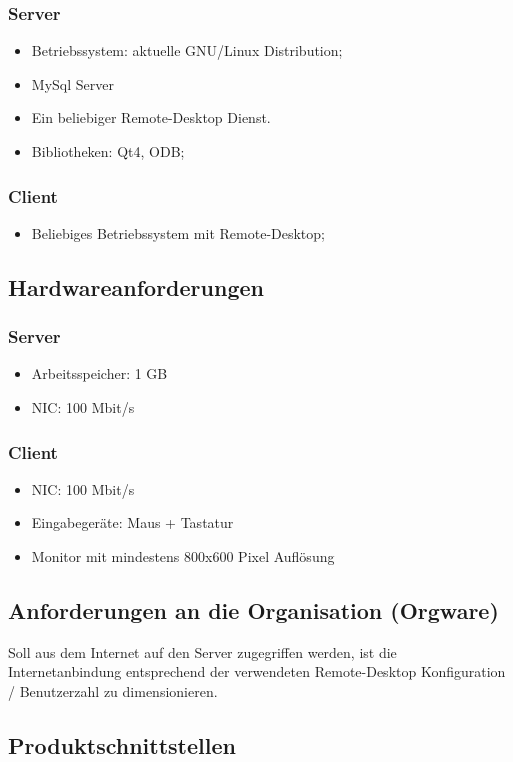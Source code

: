 \documentclass[a4paper,10pt]{article}
\begin{document}
\subsubsection{Server}
\begin{itemize}
	\item Betriebssystem: aktuelle GNU/Linux Distribution;
	\item MySql Server
	\item Ein beliebiger Remote-Desktop Dienst.
	\item Bibliotheken: Qt4, ODB;
\end{itemize}
\subsubsection{Client}
\begin{itemize}
	\item Beliebiges Betriebssystem mit Remote-Desktop;
\end{itemize}
\subsection{Hardwareanforderungen}
\subsubsection{Server}
\begin{itemize}
	\item Arbeitsspeicher: 1 GB
	\item NIC: 100 Mbit/s
\end{itemize}
\subsubsection{Client}
\begin{itemize}
	\item NIC: 100 Mbit/s
	\item Eingabegeräte: Maus + Tastatur
	\item Monitor mit mindestens 800x600 Pixel Auflösung
\end{itemize}
\subsection{Anforderungen an die Organisation (Orgware)}
Soll aus dem Internet auf den Server zugegriffen werden, ist die Internetanbindung entsprechend der verwendeten Remote-Desktop Konfiguration / Benutzerzahl zu dimensionieren.
\subsection{Produktschnittstellen}
\end{document}
